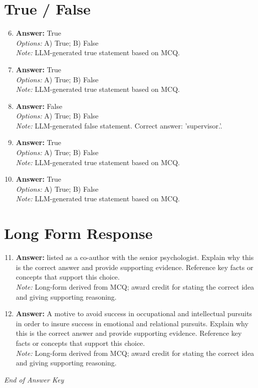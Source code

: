 \documentclass[12pt]{article}
\begin{document}
\section*{True / False}
\begin{enumerate}[label=\arabic*.]
\setcounter{enumi}{5}
\item \textbf{Answer:} True
\\ \textit{Options:} A) True; B) False
\\ \textit{Note:} LLM-generated true statement based on MCQ.
\item \textbf{Answer:} True
\\ \textit{Options:} A) True; B) False
\\ \textit{Note:} LLM-generated true statement based on MCQ.
\item \textbf{Answer:} False
\\ \textit{Options:} A) True; B) False
\\ \textit{Note:} LLM-generated false statement. Correct answer: 'supervisor.'.
\item \textbf{Answer:} True
\\ \textit{Options:} A) True; B) False
\\ \textit{Note:} LLM-generated true statement based on MCQ.
\item \textbf{Answer:} True
\\ \textit{Options:} A) True; B) False
\\ \textit{Note:} LLM-generated true statement based on MCQ.
\end{enumerate}

\section*{Long Form Response}
\begin{enumerate}[label=\arabic*.]
\setcounter{enumi}{10}
\item \textbf{Answer:} listed as a co-author with the senior psychologist. Explain why this is the correct answer and provide supporting evidence. Reference key facts or concepts that support this choice.
\\ \textit{Note:} Long-form derived from MCQ; award credit for stating the correct idea and giving supporting reasoning.
\item \textbf{Answer:} A motive to avoid success in occupational and intellectual pursuits in order to insure success in emotional and relational pursuits. Explain why this is the correct answer and provide supporting evidence. Reference key facts or concepts that support this choice.
\\ \textit{Note:} Long-form derived from MCQ; award credit for stating the correct idea and giving supporting reasoning.
\end{enumerate}

\vfill
\noindent\textit{End of Answer Key}
\end{document}
